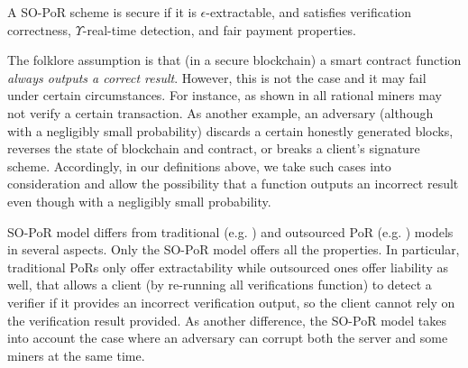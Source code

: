 



\begin{definition}\label{SO-PoR-Security} A SO-PoR scheme is secure if it is $\epsilon$-extractable, and satisfies verification correctness, $\Upsilon$-real-time detection, and fair payment properties.

\end{definition}




\begin{remark}
The folklore assumption is that (in a secure blockchain) a smart contract function \emph{always outputs a correct result}. However, this is not the case and it may fail under certain circumstances.  For instance, as shown in \cite{LuuTKS15} all rational  miners may not verify a certain transaction. As another example,  an adversary (although with a negligibly small probability)  discards a  certain honestly generated blocks,  reverses the state of blockchain and contract, or breaks a client's signature scheme.  Accordingly, in our definitions above, we take such cases  into consideration and allow the possibility that a function outputs an incorrect result even though with a negligibly small probability. 
\end{remark}




\begin{remark}
SO-PoR model differs from traditional (e.g. \cite{DBLP:conf/ccs/JuelsK07,DBLP:conf/asiacrypt/ShachamW08}) and outsourced PoR  (e.g. \cite{armknecht2014outsourced,xu2016lightweight}) models in several aspects. Only  the SO-PoR model offers all the properties. In particular,  traditional PoRs only offer extractability while outsourced ones  offer liability as well, that allows a client (by re-running all verifications function) to detect a verifier if it provides an incorrect verification output, so the client   cannot rely on the verification result provided.  As another difference, the SO-PoR model  takes into account the case where an adversary can corrupt both the server and some miners at the same time.
\end{remark}

